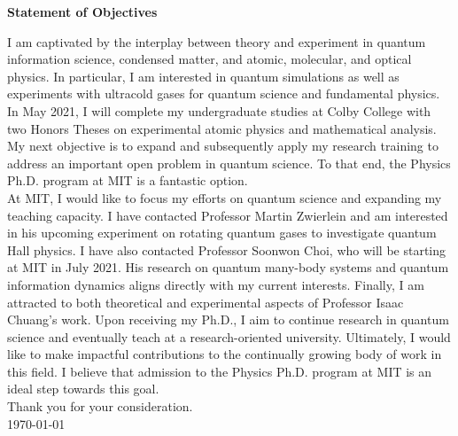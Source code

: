\documentclass[12pt]{article}
\begin{document}
\begin{center}
	\textbf{Statement of Objectives}
\end{center}
I am captivated by the interplay between theory and experiment in quantum information science, condensed matter, and atomic, molecular, and optical physics. In particular, I am interested in quantum simulations as well as experiments with ultracold gases for quantum science and fundamental physics. In May 2021, I will complete my undergraduate studies at Colby College with two Honors Theses on experimental atomic physics and mathematical analysis. My next objective is to expand and subsequently apply my research training to address an important open problem in quantum science. To that end, the Physics Ph.D. program at MIT is a fantastic option.  \\ 





At MIT, I would like to focus my efforts on quantum science and expanding my teaching capacity. I have contacted Professor Martin Zwierlein and am interested in his upcoming experiment on rotating quantum gases to investigate quantum Hall physics. I have also contacted Professor Soonwon Choi, who will be starting at MIT in July 2021. His research on quantum many-body systems and quantum information dynamics aligns directly with my current interests. Finally, I am attracted to both theoretical and experimental aspects of Professor Isaac Chuang's work. Upon receiving my Ph.D., I aim to continue research in quantum science and eventually teach at a research-oriented university. Ultimately, I would like to make impactful contributions to the continually growing body of work in this field. I believe that admission to the Physics Ph.D. program at MIT is an ideal step towards this goal. \\

\noindent Thank you for your consideration. \\

\noindent \today\\

	











	
	
	
	
	
\end{document}
